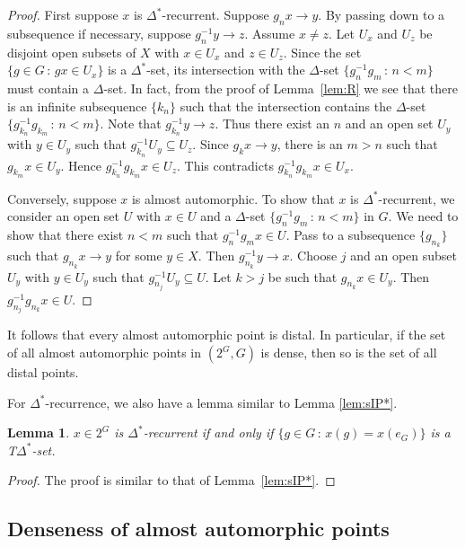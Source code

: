 \documentclass[11pt]{amsart}
\newtheorem{lemma}[theorem]{Lemma}
\theoremstyle{definition}
\numberwithin{equation}{section}
\theoremstyle{definition}
\begin{document}
\begin{proof} First suppose $x$ is $\Delta^*$-recurrent. Suppose $g_nx\to y$. By passing down to a subsequence if necessary, suppose $g_n^{-1}y\to z$. Assume $x\neq z$. Let $U_x$ and $U_z$ be disjoint open subsets of $X$ with $x\in U_x$ and $z\in U_z$. Since the set $\{g\in G\,:\, gx\in U_x\}$ is a $\Delta^*$-set, its intersection with the $\Delta$-set $\{g_n^{-1}g_m\,:\, n<m\}$ must contain a $\Delta$-set. In fact, from the proof of Lemma~\ref{lem:R} we see that there is an infinite subsequence $\{k_n\}$ such that the intersection contains the $\Delta$-set $\{g_{k_n}^{-1}g_{k_m}\,:\, n<m\}$. Note that $g_{k_n}^{-1}y\to z$. Thus there exist an $n$ and an open set $U_y$ with $y\in U_y$ such that $g_{k_n}^{-1}U_y\subseteq U_z$. Since $g_k x\to y$, there is an $m>n$ such that $g_{k_m}x\in U_y$. Hence $g_{k_n}^{-1}g_{k_m}x\in U_z$. This contradicts $g_{k_n}^{-1}g_{k_m}x\in U_x$.

Conversely, suppose $x$ is almost automorphic. To show that $x$ is $\Delta^*$-recurrent, we consider an open set $U$ with $x\in U$ and a $\Delta$-set $\{g_n^{-1}g_m\,:\, n<m\}$ in $G$. We need to show that there exist $n<m$ such that $g_n^{-1}g_mx\in U$. Pass to a subsequence $\{g_{n_k}\}$ such that $g_{n_k}x\to y$ for some $y\in X$. Then $g_{n_k}^{-1}y\to x$. Choose $j$ and an open subset $U_y$ with $y\in U_y$ such that $g_{n_j}^{-1}U_y\subseteq U$. Let $k>j$ be such that $g_{n_k}x\in U_y$. Then $g_{n_j}^{-1}g_{n_k}x\in U$.
\end{proof}

It follows that every almost automorphic point is distal. In particular, if the set of all almost automorphic points in $(2^G, G)$ is dense, then so is the set of all distal points.

For $\Delta^*$-recurrence, we also have a lemma similar to Lemma \ref{lem:sIP*}.

\begin{lemma}\label{lem:3.8} $x\in 2^G$ is $\Delta^*$-recurrent if and only if $\{g\in G\,:\, x(g)=x(e_G)\}$ is a T$\Delta^*$-set.
\end{lemma}

\begin{proof} The proof is similar to that of Lemma~\ref{lem:sIP*}.
\end{proof}



\subsection{Denseness of almost automorphic points}
 
\end{document}
